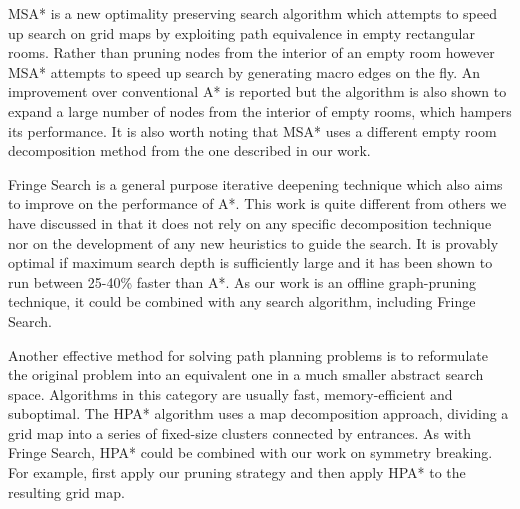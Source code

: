 \par
MSA* \cite{bolanca09} is a new optimality preserving search algorithm which attempts to speed up search 
on grid maps by exploiting path equivalence in empty rectangular rooms. 
Rather than pruning nodes from the interior of an empty room however MSA* attempts to speed up 
search by generating macro edges on the fly.
An improvement over conventional A* is reported but the algorithm is also
shown to expand a large number of nodes from the interior of empty rooms, which hampers its performance.
It is also worth noting that MSA* uses a different empty room decomposition method
from the one described in our work.
\par
Fringe Search \cite{bjornsson05} is a general purpose iterative deepening technique which also
aims to improve on the performance of A*.
This work is quite different from others we have discussed in that it does not
rely on any specific decomposition technique nor on the development of any new heuristics
to guide the search.
It is provably optimal if maximum search depth is sufficiently large and 
it has been shown to run between 25-40\% faster than A*.
As our work is an offline graph-pruning technique, it could be combined with any search algorithm, including
Fringe Search.
\par
Another effective method for solving path planning problems is to reformulate the original problem
into an equivalent one in a much smaller abstract search space.
Algorithms in this category are usually fast, memory-efficient and suboptimal.
The HPA* algorithm \cite{botea04} uses a map decomposition approach,
dividing a grid map into a series of fixed-size clusters connected 
by entrances.
As with Fringe Search, HPA* could be combined with our work on symmetry breaking.
For example, first apply our pruning strategy and then apply HPA* to the resulting grid map.

